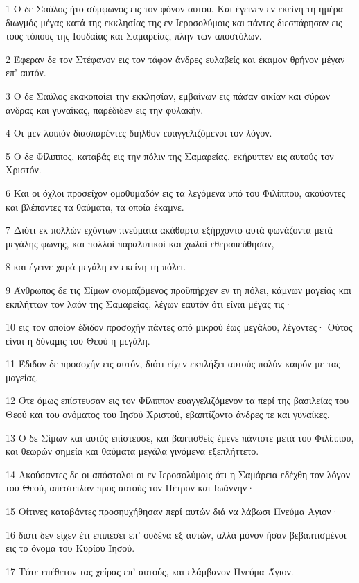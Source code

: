 \par 1 Ο δε Σαύλος ήτο σύμφωνος εις τον φόνον αυτού. Και έγεινεν εν εκείνη τη ημέρα διωγμός μέγας κατά της εκκλησίας της εν Ιεροσολύμοις και πάντες διεσπάρησαν εις τους τόπους της Ιουδαίας και Σαμαρείας, πλην των αποστόλων.
\par 2 Έφεραν δε τον Στέφανον εις τον τάφον άνδρες ευλαβείς και έκαμον θρήνον μέγαν επ' αυτόν.
\par 3 Ο δε Σαύλος εκακοποίει την εκκλησίαν, εμβαίνων εις πάσαν οικίαν και σύρων άνδρας και γυναίκας, παρέδιδεν εις την φυλακήν.
\par 4 Οι μεν λοιπόν διασπαρέντες διήλθον ευαγγελιζόμενοι τον λόγον.
\par 5 Ο δε Φίλιππος, καταβάς εις την πόλιν της Σαμαρείας, εκήρυττεν εις αυτούς τον Χριστόν.
\par 6 Και οι όχλοι προσείχον ομοθυμαδόν εις τα λεγόμενα υπό του Φιλίππου, ακούοντες και βλέποντες τα θαύματα, τα οποία έκαμνε.
\par 7 Διότι εκ πολλών εχόντων πνεύματα ακάθαρτα εξήρχοντο αυτά φωνάζοντα μετά μεγάλης φωνής, και πολλοί παραλυτικοί και χωλοί εθεραπεύθησαν,
\par 8 και έγεινε χαρά μεγάλη εν εκείνη τη πόλει.
\par 9 Άνθρωπος δε τις Σίμων ονομαζόμενος προϋπήρχεν εν τη πόλει, κάμνων μαγείας και εκπλήττων τον λαόν της Σαμαρείας, λέγων εαυτόν ότι είναι μέγας τις·
\par 10 εις τον οποίον έδιδον προσοχήν πάντες από μικρού έως μεγάλου, λέγοντες· Ούτος είναι η δύναμις του Θεού η μεγάλη.
\par 11 Έδιδον δε προσοχήν εις αυτόν, διότι είχεν εκπλήξει αυτούς πολύν καιρόν με τας μαγείας.
\par 12 Ότε όμως επίστευσαν εις τον Φίλιππον ευαγγελιζόμενον τα περί της βασιλείας του Θεού και του ονόματος του Ιησού Χριστού, εβαπτίζοντο άνδρες τε και γυναίκες.
\par 13 Ο δε Σίμων και αυτός επίστευσε, και βαπτισθείς έμενε πάντοτε μετά του Φιλίππου, και θεωρών σημεία και θαύματα μεγάλα γινόμενα εξεπλήττετο.
\par 14 Ακούσαντες δε οι απόστολοι οι εν Ιεροσολύμοις ότι η Σαμάρεια εδέχθη τον λόγον του Θεού, απέστειλαν προς αυτούς τον Πέτρον και Ιωάννην·
\par 15 Οίτινες καταβάντες προσηυχήθησαν περί αυτών διά να λάβωσι Πνεύμα Αγιον·
\par 16 διότι δεν είχεν έτι επιπέσει επ' ουδένα εξ αυτών, αλλά μόνον ήσαν βεβαπτισμένοι εις το όνομα του Κυρίου Ιησού.
\par 17 Τότε επέθετον τας χείρας επ' αυτούς, και ελάμβανον Πνεύμα Άγιον.

